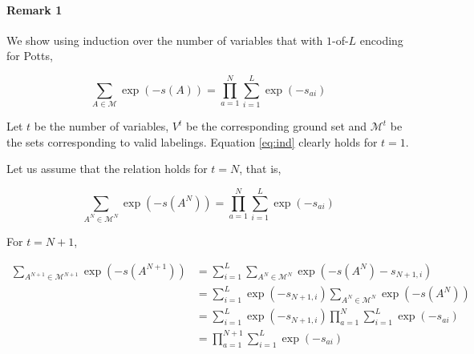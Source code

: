 \appendix
{} 

\paragraph{Remark 1} We show using induction over the number of variables that with $1$-of-$L$ encoding for Potts, 

\begin{equation}
    \sum_{A \in {\mathcal M}} \exp(-s(A)) = \prod_{a = 1}^{N} \sum_{i = 1}^L \exp(-s_{ai})
\end{equation}

Let $t$ be the number of variables, $V^t$ be the corresponding ground set and ${\mathcal M}^t$ be the sets corresponding to valid labelings. Equation \eqref{eq:ind} clearly holds for $t = 1$.

Let us assume that the relation holds for $t = N$, that is,

\begin{equation}
    \sum_{A^N \in {\mathcal M}^N} \exp(-s(A^N)) = \prod_{a = 1}^{N} \sum_{i = 1}^L \exp(-s_{ai})
\end{equation}

For $t = N + 1$, 

\begin{align}
    \sum_{A^{N + 1} \in {\mathcal M}^{N + 1}} \exp(-s(A^{N + 1})) &=  \sum_{i = 1}^L \sum_{A^N \in {\mathcal M}^{N}} \exp(-s(A^N) - s_{N+1, i}) \nonumber \\
                                                                  &= \sum_{i = 1}^L \exp(-s_{N+1, i}) \sum_{A^N \in {\mathcal M}^{N}} \exp(-s(A^N) ) \nonumber \\
                                                                  &= \sum_{i = 1}^L \exp(-s_{N+1, i}) \prod_{a = 1}^{N} \sum_{i = 1}^L \exp(-s_{ai}) \nonumber \\
                                                                  &= \prod_{a = 1}^{N + 1} \sum_{i = 1}^L \exp(-s_{ai})
\end{align}

